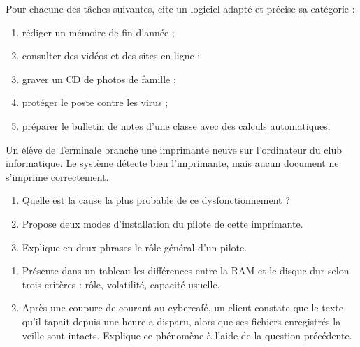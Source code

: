 \documentclass[11pt]{article}
\newcounter{popsec}
\newcounter{popsub}
\newcommand{\courssub}[1]{%
  \stepcounter{popsub}%
  \par\vspace{9pt}\noindent{\popxbold\fontsize{11.5}{13}\selectfont\color{popink}{\color{poporange}\thepopsec.\thepopsub}\hspace{6pt}#1}\par\nopagebreak\vspace{4pt}
}
\begin{document}
\begin{exercice}
Pour chacune des tâches suivantes, cite un logiciel adapté et précise sa catégorie :
\begin{enumerate}
\item rédiger un mémoire de fin d'année ;
\item consulter des vidéos et des sites en ligne ;
\item graver un CD de photos de famille ;
\item protéger le poste contre les virus ;
\item préparer le bulletin de notes d'une classe avec des calculs automatiques.
\end{enumerate}
\end{exercice}

\begin{exercice}
Un élève de Terminale branche une imprimante neuve sur l'ordinateur du club informatique. Le système détecte bien l'imprimante, mais aucun document ne s'imprime correctement.
\begin{enumerate}
\item Quelle est la cause la plus probable de ce dysfonctionnement ?
\item Propose deux modes d'installation du pilote de cette imprimante.
\item Explique en deux phrases le rôle général d'un pilote.
\end{enumerate}
\end{exercice}

\begin{exercice}
\begin{enumerate}
\item Présente dans un tableau les différences entre la RAM et le disque dur selon trois critères : rôle, volatilité, capacité usuelle.
\item Après une coupure de courant au cybercafé, un client constate que le texte qu'il tapait depuis une heure a disparu, alors que ses fichiers enregistrés la veille sont intacts. Explique ce phénomène à l'aide de la question précédente.
\end{enumerate}
\end{exercice}

\courssub{Je me prépare au Bac}
\end{document}
